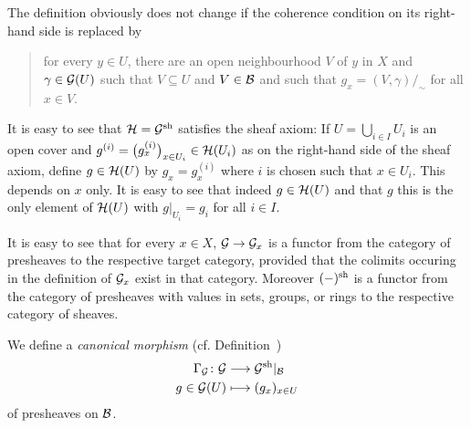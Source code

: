 \documentclass[a4paper,parskip=half,numbers=enddot, DIV=12]{scrreprt}
\begin{document}
\begin{rem*}    
    \begin{alphanumerate}
      \item 
        The definition  obviously does not change if the coherence condition on its right-hand side is replaced by 
        \begin{quote}
            for every $y\in U$, there are an open neighbourhood $V$ of $y$ in $X$ and $\gamma\in \mathcal{G}(U)$ such that $V\subseteq U$ and $V\in\mathcal{B}$ and such that $g_x =(V,\gamma)/_\sim$ for all $x\in V$.
        \end{quote}
      \item 
        It is easy to see that $\mathcal{H}=\mathcal{G}^{\mathrm{sh}}$ satisfies the sheaf axiom: If $U = \bigcup_{i\in I} U_i$ is an open cover and $g^{(i)} = \big(g^{(i)}_x\big)_{x\in U_i}\in \mathcal{H}(U_i)$ as on the right-hand side of the sheaf axiom, define $g\in \mathcal{H}(U)$ by $g_x = g_x^{(i)}$ where $i$ is chosen such that $x\in U_i$. This depends on $x$ only. It is easy to see that indeed $g\in \mathcal{H}(U)$ and that $g$ this is the only element of $\mathcal{H}(U)$ with $g|_{U_i} = g_i$ for all $i\in I$.
      \item
        It is easy to see that for every $x\in X$, $\mathcal{G}\to \mathcal{G}_x$ is a functor from the category of presheaves to the respective target category, provided that the colimits occuring in the definition of $\mathcal{G}_x$ exist in that category. Moreover $(-)^{\mathrm{sh}}$ is a functor from the category of presheaves with values in sets, groups, or rings to the respective category of sheaves.
    \end{alphanumerate}
\end{rem*}
We define a \emph{canonical morphism} (cf. Definition~)
\begin{align*}
    \Gamma_\Gg\colon\Gg&\morphism \Gg^\sh|_\Bb\\
    g\in \Gg(U) &\longmapsto (g_x)_{x\in U}
\end{align*}
of presheaves on $\mathcal{B}$.
\end{document}
